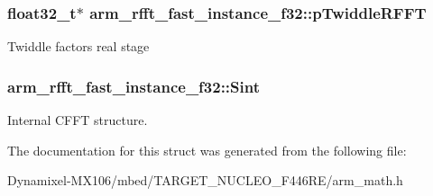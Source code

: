 \subsubsection[{\texorpdfstring{p\+Twiddle\+R\+F\+FT}{pTwiddleRFFT}}]{\setlength{\rightskip}{0pt plus 5cm}float32\+\_\+t$\ast$ arm\+\_\+rfft\+\_\+fast\+\_\+instance\+\_\+f32\+::p\+Twiddle\+R\+F\+FT}\hypertarget{structarm__rfft__fast__instance__f32_a9f30b04f163fabc1b24421d3c323d5fc}{}\label{structarm__rfft__fast__instance__f32_a9f30b04f163fabc1b24421d3c323d5fc}
Twiddle factors real stage 
\subsubsection[{\texorpdfstring{Sint}{Sint}}]{ arm\+\_\+rfft\+\_\+fast\+\_\+instance\+\_\+f32\+::\+Sint}\hypertarget{structarm__rfft__fast__instance__f32_a37419ababdfb3151b1891ae6bcd21012}{}\label{structarm__rfft__fast__instance__f32_a37419ababdfb3151b1891ae6bcd21012}
Internal C\+F\+FT structure. 

The documentation for this struct was generated from the following file\+:\begin{DoxyCompactItemize}
\item 
Dynamixel-\/\+M\+X106/mbed/\+T\+A\+R\+G\+E\+T\+\_\+\+N\+U\+C\+L\+E\+O\+\_\+\+F446\+R\+E/arm\+\_\+math.\+h\end{DoxyCompactItemize}
